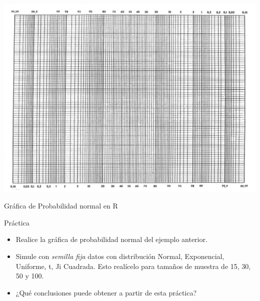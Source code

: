 \documentclass[
  10pt,
  ignorenonframetext,
]{beamer}
\begin{document}
\begin{frame}{}
\protect\hypertarget{section-47}{}
\includegraphics{figuras/probpaperLandscape.png}
\end{frame}

\begin{frame}{Gráfica de Probabilidad normal en R}
\protect\hypertarget{gruxe1fica-de-probabilidad-normal-en-r}{}
\begin{block}{Práctica}
\protect\hypertarget{pruxe1ctica}{}
\begin{itemize}
\item
  Realice la gráfica de probabilidad normal del ejemplo anterior.
\item
  Simule con \emph{semilla fija} datos con distribución Normal,
  Exponencial, Uniforme, t, Ji Cuadrada. Esto realícelo para tamaños de
  muestra de 15, 30, 50 y 100.
\item
  ¿Qué conclusiones puede obtener a partir de esta práctica?
\end{itemize}
\end{block}
\end{frame}
\end{document}
